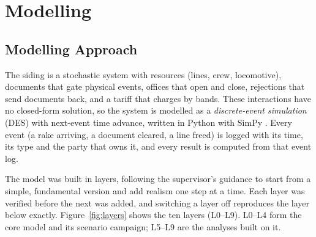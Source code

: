 \chapter{Modelling}
\label{ch:model}

\section{Modelling Approach}
\label{sec:approach}
The siding is a stochastic system with resources (lines, crew, locomotive), documents that gate physical events, offices that open and close, rejections that send documents back, and a tariff that charges by bands. These interactions have no closed-form solution, so the system is modelled as a \emph{discrete-event simulation} (DES) with next-event time advance, written in Python with SimPy \cite{simpy}. Every event (a rake arriving, a document cleared, a line freed) is logged with its time, its type and the party that owns it, and every result is computed from that event log.

The model was built in layers, following the supervisor's guidance to start from a simple, fundamental version and add realism one step at a time. Each layer was verified before the next was added, and switching a layer off reproduces the layer below exactly. Figure~\ref{fig:layers} shows the ten layers (L0--L9). L0--L4 form the core model and its scenario campaign; L5--L9 are the analyses built on it.

